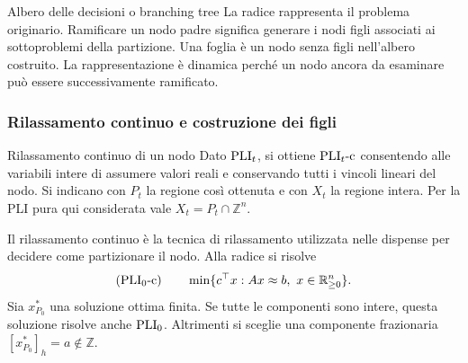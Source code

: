 \begin{definition}{Albero delle decisioni o branching tree}
La radice rappresenta il problema originario. Ramificare un nodo
padre significa generare i nodi figli associati ai sottoproblemi della
partizione. Una foglia è un nodo senza figli nell'albero costruito.
La rappresentazione è dinamica perché un nodo ancora da esaminare può
essere successivamente ramificato.
\end{definition}

\begin{center}
\end{center}

\subsubsection{Rilassamento continuo e costruzione dei figli}

\begin{definition}{Rilassamento continuo di un nodo}
Dato $\mathrm{PLI}_{t}$, si ottiene $\mathrm{PLI}_{t}\text{-c}$ consentendo alle variabili intere
di assumere valori reali e conservando tutti i vincoli lineari del nodo.
Si indicano con $P_t$ la regione così ottenuta e con $X_t$ la regione
intera. Per la PLI pura qui considerata vale $X_t=P_t\cap\mathbb Z^n$.
\end{definition}

Il rilassamento continuo è la tecnica di rilassamento utilizzata nelle
dispense per decidere come partizionare il nodo. Alla radice si risolve
\[
 (\mathrm{PLI}_{0}\text{-c})\qquad \min\{c^\top x:Ax\approx b,\ x\in\mathbb R^n_{\geq 0}\}.
\]
Sia $x^*_{P_0}$ una soluzione ottima finita. Se tutte le componenti
sono intere, questa soluzione risolve anche $\mathrm{PLI}_{0}$. Altrimenti si
sceglie una componente frazionaria $[x^*_{P_0}]_h=a\notin\mathbb Z$.

